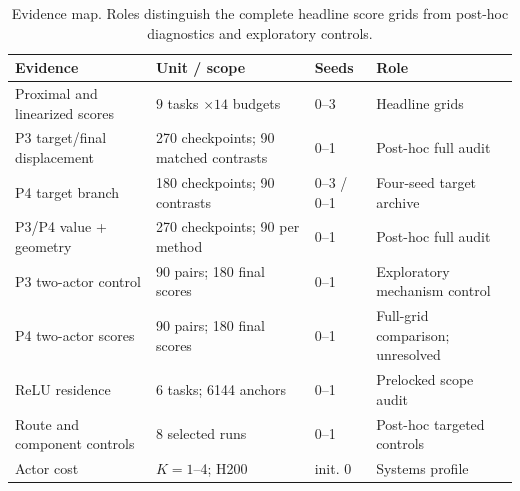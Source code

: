 \documentclass[twoside]{article}
\begin{document}
\begin{table}[t]
\caption{Evidence map. Roles distinguish the complete headline score grids
from post-hoc diagnostics and exploratory controls.}
\centering
\small
\setlength{\tabcolsep}{3pt}
\begin{tabular}{@{}llll@{}}
\toprule
Evidence & Unit / scope & Seeds & Role\\
\midrule
Proximal and linearized scores & $9$ tasks $\times14$ budgets & 0--3 & Headline grids\\
P3 target/final displacement & 270 checkpoints; 90 matched contrasts & 0--1 & Post-hoc full audit\\
P4 target branch & 180 checkpoints; 90 contrasts & 0--3 / 0--1 & Four-seed target archive\\
P3/P4 value + geometry & 270 checkpoints; 90 per method & 0--1 & Post-hoc full audit\\
P3 two-actor control & 90 pairs; 180 final scores & 0--1 & Exploratory mechanism control\\
P4 two-actor scores & 90 pairs; 180 final scores & 0--1 & Full-grid comparison; unresolved\\
ReLU residence & 6 tasks; 6144 anchors & 0--1 & Prelocked scope audit\\
Route and component controls & 8 selected runs & 0--1 & Post-hoc targeted controls\\
Actor cost & $K=1$--4; H200 & init. 0 & Systems profile\\
\bottomrule
\end{tabular}
\label{tab:evidence_map}
\end{table}
\end{document}
